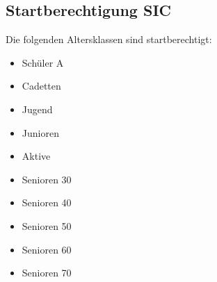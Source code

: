 \subsection{Startberechtigung SIC}
Die folgenden Altersklassen sind startberechtigt:
\begin{itemize}
	\item Schüler A
	\item Cadetten
	\item Jugend
	\item Junioren
	\item Aktive
	\item Senioren 30
	\item Senioren 40
	\item Senioren 50
	\item Senioren 60
	\item Senioren 70
\end{itemize}